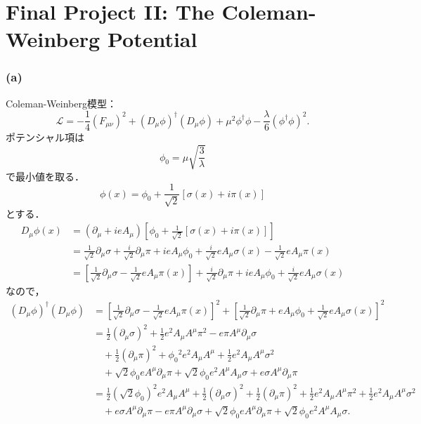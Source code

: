 \renewcommand\theequation{\Roman{part}.\arabic{equation}}
\chapter*{Final Project II: The Coleman-Weinberg Potential}
\subsection{(a)}
Coleman-Weinberg模型：
\[
\mathcal{L} = - \frac{1}{4} (F_{\mu\nu})^2 + (D_\mu\phi)^\dagger (D_\mu\phi)
+ \mu^2 \phi^\dagger \phi - \frac{\lambda}{6} (\phi^\dagger \phi)^2 .
\]
ポテンシャル項は
\[ \phi_0 = \mu\sqrt{\frac{3}{\lambda}} \]
で最小値を取る．
\[ \phi(x) = \phi_0 + \frac{1}{\sqrt{2}} [\sigma(x) + i \pi(x)] \]
とする．
\begin{align*}
  D_\mu \phi(x) &= (\partial_\mu + ieA_\mu) \left[ \phi_0 + \frac{1}{\sqrt{2}} [\sigma(x) + i \pi(x)] \right] \\
  &= \frac{1}{\sqrt{2}} \partial_\mu \sigma + \frac{i}{\sqrt{2}} \partial_\mu \pi
  + ieA_\mu \phi_0 + \frac{i}{\sqrt{2}}eA_\mu \sigma(x) - \frac{1}{\sqrt{2}} eA_\mu \pi(x) \\
  &= \left[ \frac{1}{\sqrt{2}} \partial_\mu \sigma - \frac{1}{\sqrt{2}} eA_\mu \pi(x) \right]
  + \frac{i}{\sqrt{2}} \partial_\mu \pi + ieA_\mu \phi_0 + \frac{i}{\sqrt{2}}eA_\mu \sigma(x)
\end{align*}
なので，
\begin{align*}
  (D_\mu\phi)^\dagger (D_\mu\phi)
  &= \left[ \frac{1}{\sqrt{2}} \partial_\mu \sigma - \frac{1}{\sqrt{2}} eA_\mu \pi(x) \right]^2
  + \left[ \frac{1}{\sqrt{2}} \partial_\mu \pi + eA_\mu \phi_0 + \frac{1}{\sqrt{2}}eA_\mu \sigma(x) \right]^2 \\
  &= \frac{1}{2} (\partial_\mu\sigma)^2 + \frac{1}{2} e^2 A_\mu A^\mu \pi^2 - e \pi A^\mu \partial_\mu\sigma \\
  &\quad + \frac{1}{2} (\partial_\mu\pi)^2 + \phi_0{}^2 e^2 A_\mu A^\mu + \frac{1}{2} e^2 A_\mu A^\mu \sigma^2 \\
  &\quad + \sqrt{2} \phi_0 e A^\mu \partial_\mu\pi + \sqrt{2} \phi_0 e^2 A^\mu A_\mu \sigma + e \sigma A^\mu \partial_\mu\pi \\
  &= \frac{1}{2} (\sqrt{2}\phi_0)^2 e^2 A_\mu A^\mu + \frac{1}{2} (\partial_\mu\sigma)^2 + \frac{1}{2} (\partial_\mu\pi)^2
  + \frac{1}{2} e^2 A_\mu A^\mu \pi^2 + \frac{1}{2} e^2 A_\mu A^\mu \sigma^2 \\
  &\quad + e \sigma A^\mu \partial_\mu\pi - e \pi A^\mu \partial_\mu\sigma
  + \sqrt{2} \phi_0 e A^\mu \partial_\mu\pi + \sqrt{2} \phi_0 e^2 A^\mu A_\mu \sigma .
\end{align*}

